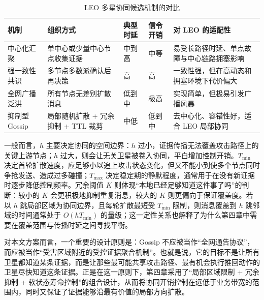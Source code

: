 \begin{table}[t]
\centering
\caption{LEO 多星协同候选机制的对比}
\label{tab:ch2_collaboration_compare}
\small
\begin{tabular}{|p{2.2cm}|p{2.3cm}|p{2.1cm}|p{2.1cm}|p{3.2cm}|}
\hline
机制 & 组织方式 & 典型时延 & 信令开销 & 对 LEO 的适配性 \\
\hline
中心化汇聚 & 单中心或少量中心节点收集证据 & 中到高 & 中等 & 易受长路径时延、单点故障与中心链路拥塞影响 \\
\hline
强一致性共识 & 多节点多数派确认后再决策 & 高 & 高 & 一致性强，但在高动态和拥塞环境下代价偏大 \\
\hline
全网广播泛洪 & 所有节点无差别扩散消息 & 低到中 & 极高 & 实现简单，但极易引发广播风暴 \\
\hline
抑制型 Gossip & 局部随机扩散 + 冗余抑制 + TTL 裁剪 & 中低 & 低到中 & 去中心化、容错性好，适合 LEO 局部协同 \\
\hline
\end{tabular}
\end{table}

一般而言，$h$ 主要决定协同的空间边界：$h$ 过小，证据传播无法覆盖攻击路径上的关键上游节点；$h$ 过大，则会让无关卫星被卷入协同，平白增加控制开销。$T_{\min}$ 决定首轮扩散速度，应足够小以追上攻击状态变化，但又不能小到使多个节点同时争抢发送、造成过多碰撞；$T_{\max}$ 决定稳定期的静默程度，通常用于在没有新证据时逐步降低控制频率。冗余阈值 $K$ 则体现“本地已经足够知道这件事了吗”的判断：较小的 $K$ 会更积极地抑制重复消息，较大的 $K$ 则更偏向于保证覆盖度。若以 $h$ 跳局部区域为协同边界，且每轮扩散最短受 $T_{\min}$ 限制，则消息覆盖到 $h$ 跳邻域的时间通常处于 $O(hT_{\min})$ 的量级；这一定性关系也解释了为什么第四章中需要在覆盖范围与传播时延之间寻找平衡。

对本文方案而言，一个重要的设计原则是：Gossip 不应被当作“全网通告协议”，而应被当作“受害区域附近的受控证据聚合机制”。也就是说，它的目标不是让所有卫星都知道某条证据，而是让那些最可能共享攻击路径、最有机会执行推回动作的卫星尽快知道这条证据。正是在这一原则下，第四章采用了“局部区域限制 + 冗余抑制 + 软状态寿命控制”的组合设计，从而将协同开销控制在远低于业务带宽的范围内，同时又保证了证据能够沿最有价值的局部方向扩散。


